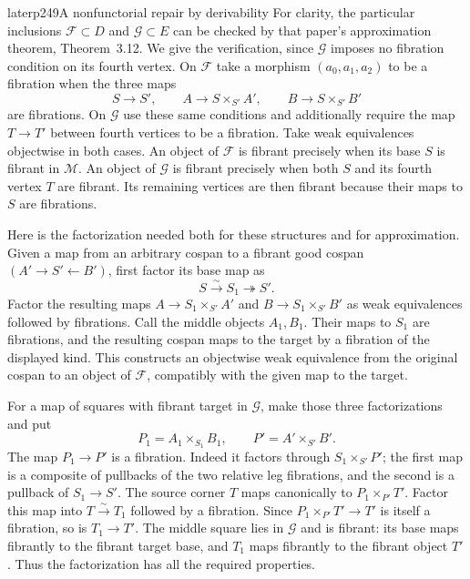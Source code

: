 \begin{dcomment}{later}{p249}{A nonfunctorial repair by derivability}
For clarity, the particular inclusions $\mathcal F\subset D$ and $\mathcal G\subset E$ can be checked by that paper's approximation theorem, Theorem~3.12. We give the verification, since $\mathcal G$ imposes no fibration condition on its fourth vertex. On $\mathcal F$ take a morphism $(a_0,a_1,a_2)$ to be a fibration when the three maps
\[
 S\to S',\qquad
 A\to S\times_{S'}A',\qquad
 B\to S\times_{S'}B'
\]
are fibrations. On $\mathcal G$ use these same conditions and additionally require the map $T\to T'$ between fourth vertices to be a fibration. Take weak equivalences objectwise in both cases. An object of $\mathcal F$ is fibrant precisely when its base $S$ is fibrant in $\mathcal M$. An object of $\mathcal G$ is fibrant precisely when both $S$ and its fourth vertex $T$ are fibrant. Its remaining vertices are then fibrant because their maps to $S$ are fibrations.

Here is the factorization needed both for these structures and for approximation. Given a map from an arbitrary cospan to a fibrant good cospan $(A'\to S'\leftarrow B')$, first factor its base map as
\[
 S\xrightarrow{\sim}S_1\twoheadrightarrow S'.
\]
Factor the resulting maps $A\to S_1\times_{S'}A'$ and $B\to S_1\times_{S'}B'$ as weak equivalences followed by fibrations. Call the middle objects $A_1,B_1$. Their maps to $S_1$ are fibrations, and the resulting cospan maps to the target by a fibration of the displayed kind. This constructs an objectwise weak equivalence from the original cospan to an object of $\mathcal F$, compatibly with the given map to the target.

For a map of squares with fibrant target in $\mathcal G$, make those three factorizations and put
\[
 P_1=A_1\times_{S_1}B_1,\qquad P'=A'\times_{S'}B'.
\]
The map $P_1\to P'$ is a fibration. Indeed it factors through $S_1\times_{S'}P'$; the first map is a composite of pullbacks of the two relative leg fibrations, and the second is a pullback of $S_1\to S'$. The source corner $T$ maps canonically to $P_1\times_{P'}T'$. Factor this map into $T\xrightarrow{\sim}T_1$ followed by a fibration. Since $P_1\times_{P'}T'\to T'$ is itself a fibration, so is $T_1\to T'$. The middle square lies in $\mathcal G$ and is fibrant: its base maps fibrantly to the fibrant target base, and $T_1$ maps fibrantly to the fibrant object $T'$. Thus the factorization has all the required properties.


\end{dcomment}
